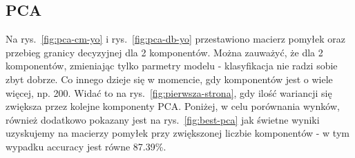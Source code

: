 \documentclass[10pt]{article}
\begin{document}
\subsection*{PCA}
Na rys.~\ref{fig:pca-cm-yo} i rys.~\ref{fig:pca-db-yo}  przestawiono macierz pomyłek oraz przebieg granicy decyzyjnej dla 2 komponentów.
Można zauważyć, że dla 2 komponentów, zmieniając tylko parmetry modelu - klasyfikacja nie radzi sobie zbyt dobrze. Co innego dzieje się w momencie,
gdy komponentów jest o wiele więcej, np. 200. Widać to na rys.~\ref{fig:pierwsza-strona}, gdy ilość wariancji się zwiększa przez kolejne komponenty PCA.
Poniżej, w celu porównania wynków, również dodatkowo pokazany jest na rys.~\ref{fig:best-pca} jak świetne wyniki uzyskujemy na macierzy pomyłek
przy zwiększonej liczbie komponentów - w tym wypadku accuracy jest równe 87.39\%.
\end{document}
